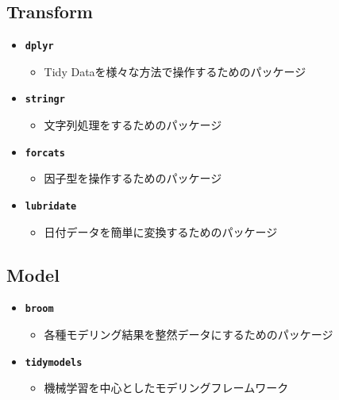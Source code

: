 \documentclass[
  12pt,
]{book}
\providecommand{\tightlist}{%
  \setlength{\itemsep}{0pt}\setlength{\parskip}{0pt}}
\begin{document}
\hypertarget{transform-1}{%
\subsection*{Transform}\label{transform-1}}

\begin{itemize}
\tightlist
\item
  \textbf{\texttt{dplyr}}

  \begin{itemize}
  \tightlist
  \item
    Tidy Dataを様々な方法で操作するためのパッケージ\citep{R-dplyr}
  \end{itemize}
\item
  \textbf{\texttt{stringr}}

  \begin{itemize}
  \tightlist
  \item
    文字列処理をするためのパッケージ\citep{R-stringr}
  \end{itemize}
\item
  \textbf{\texttt{forcats}}

  \begin{itemize}
  \tightlist
  \item
    因子型を操作するためのパッケージ\citep{R-forcats}
  \end{itemize}
\item
  \textbf{\texttt{lubridate}}

  \begin{itemize}
  \tightlist
  \item
    日付データを簡単に変換するためのパッケージ\citep{R-lubridate}
  \end{itemize}
\end{itemize}

\hypertarget{model-1}{%
\subsection*{Model}\label{model-1}}

\begin{itemize}
\tightlist
\item
  \textbf{\texttt{broom}}

  \begin{itemize}
  \tightlist
  \item
    各種モデリング結果を整然データにするためのパッケージ\citep{R-broom}
  \end{itemize}
\item
  \textbf{\texttt{tidymodels}}

  \begin{itemize}
  \tightlist
  \item
    機械学習を中心としたモデリングフレームワーク\citep{tidymodels2020, R-tidymodels}
  \end{itemize}
\end{itemize}
\end{document}
